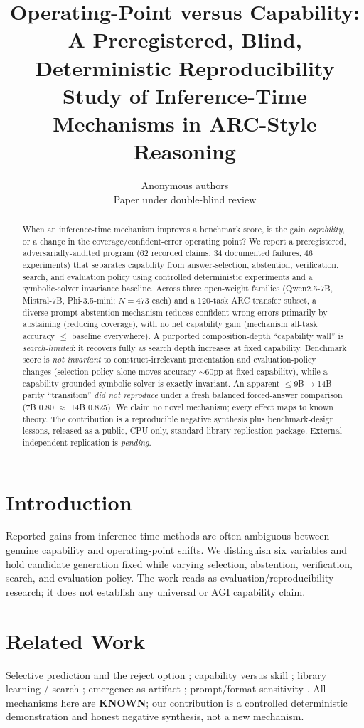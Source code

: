 \documentclass{article}
\title{Operating-Point versus Capability: A Preregistered, Blind, Deterministic Reproducibility Study of Inference-Time Mechanisms in ARC-Style Reasoning}
\author{Anonymous authors\\Paper under double-blind review}
\begin{document}
\maketitle

\begin{abstract}
When an inference-time mechanism improves a benchmark score, is the gain \emph{capability}, or a change in the coverage/confident-error operating point? We report a preregistered, adversarially-audited program (62 recorded claims, 34 documented failures, 46 experiments) that separates capability from answer-selection, abstention, verification, search, and evaluation policy using controlled deterministic experiments and a symbolic-solver invariance baseline. Across three open-weight families (Qwen2.5-7B, Mistral-7B, Phi-3.5-mini; $N{=}473$ each) and a 120-task ARC transfer subset, a diverse-prompt abstention mechanism reduces confident-wrong errors primarily by abstaining (reducing coverage), with no net capability gain (mechanism all-task accuracy $\le$ baseline everywhere). A purported composition-depth ``capability wall'' is \emph{search-limited}: it recovers fully as search depth increases at fixed capability. Benchmark score is \emph{not invariant} to construct-irrelevant presentation and evaluation-policy changes (selection policy alone moves accuracy $\sim$60pp at fixed capability), while a capability-grounded symbolic solver is exactly invariant. An apparent $\le$9B$\to$14B parity ``transition'' \emph{did not reproduce} under a fresh balanced forced-answer comparison (7B 0.80 $\approx$ 14B 0.825). We claim no novel mechanism; every effect maps to known theory. The contribution is a reproducible negative synthesis plus benchmark-design lessons, released as a public, CPU-only, standard-library replication package. External independent replication is \emph{pending}.
\end{abstract}

\section{Introduction}
Reported gains from inference-time methods are often ambiguous between genuine capability and operating-point shifts. We distinguish six variables and hold candidate generation fixed while varying selection, abstention, verification, search, and evaluation policy. The work reads as evaluation/reproducibility research; it does not establish any universal or AGI capability claim.

\section{Related Work}
Selective prediction and the reject option \citep{elyaniv2010}; capability versus skill \citep{chollet2019}; library learning / search \citep{ellis2020}; emergence-as-artifact \citep{schaeffer2023}; prompt/format sensitivity \citep{sclar2023}. All mechanisms here are \textbf{KNOWN}; our contribution is a controlled deterministic demonstration and honest negative synthesis, not a new mechanism.
\end{document}
